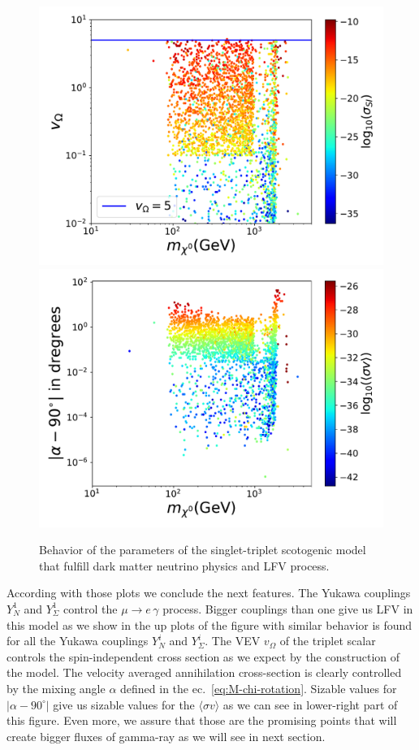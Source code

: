 \documentclass[12pt,letterpaper]{article}
\begin{document}
\begin{figure}
\begin{center}
\includegraphics[scale=0.4]{vT}
\includegraphics[scale=0.4]{alpha}
\caption{Behavior of the parameters of the singlet-triplet scotogenic model that fulfill dark matter neutrino physics and LFV process.}
\label{fig:model-parameters}
\end{center}
\end{figure}
%
According with those plots we conclude the next features. The Yukawa couplings $Y_{N}^1$ and $Y_{\Sigma}^1$ control the $\mu\rightarrow e\,\gamma$ process. Bigger couplings than one give us LFV in this model as we show in the up plots of the figure with similar behavior is found for all the Yukawa couplings $Y_{N}^i$ and $Y_{\Sigma}^i$.
The VEV $v_{\Omega}$ of the triplet scalar controls the spin-independent cross section as we expect by the construction of the model. 
The velocity averaged annihilation cross-section is clearly controlled by the mixing angle $\alpha$ defined in the ec.~\ref{eq:M-chi-rotation}. 
Sizable values for $|\alpha-90^{\circ}|$ give us sizable values for the $\langle\sigma v\rangle$ as we can see in lower-right part of this figure. Even more, we assure that those are the promising points that will create bigger fluxes of gamma-ray as we will see in next section.
\end{document}
